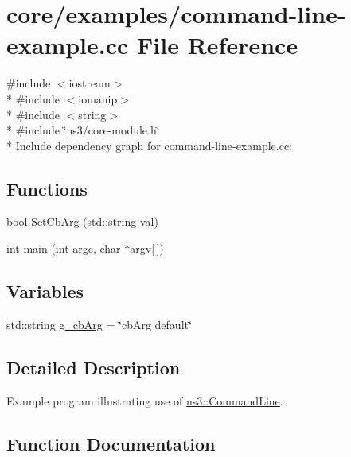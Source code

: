\hypertarget{command-line-example_8cc}{}\section{core/examples/command-\/line-\/example.cc File Reference}
\label{command-line-example_8cc}
{\ttfamily \#include $<$iostream$>$}\\*
{\ttfamily \#include $<$iomanip$>$}\\*
{\ttfamily \#include $<$string$>$}\\*
{\ttfamily \#include \char`\"{}ns3/core-\/module.\+h\char`\"{}}\\*
Include dependency graph for command-\/line-\/example.cc\+:
\subsection*{Functions}
\begin{DoxyCompactItemize}
\item 
bool \hyperlink{command-line-example_8cc_adeee81f82b40e460fd3e5165bac7d91f}{Set\+Cb\+Arg} (std\+::string val)
\item 
int \hyperlink{command-line-example_8cc_a0ddf1224851353fc92bfbff6f499fa97}{main} (int argc, char $\ast$argv\mbox{[}$\,$\mbox{]})
\end{DoxyCompactItemize}
\subsection*{Variables}
\begin{DoxyCompactItemize}
\item 
std\+::string \hyperlink{command-line-example_8cc_a99e375de1019bb4a4246819f47a4cbdc}{g\+\_\+cb\+Arg} = \char`\"{}cb\+Arg default\char`\"{}
\end{DoxyCompactItemize}


\subsection{Detailed Description}
Example program illustrating use of \hyperlink{classns3_1_1CommandLine}{ns3\+::\+Command\+Line}. 

\subsection{Function Documentation}

